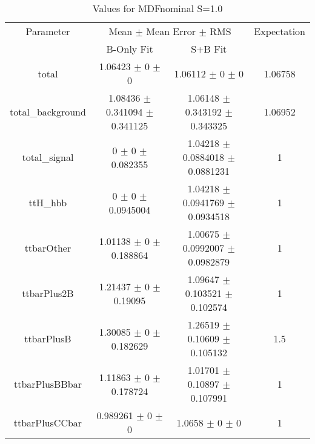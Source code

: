 \begin{table}
\centering
\caption{Values for MDFnominal S=1.0}
\begin{tabular}{cccc}
\toprule
Parameter & \multicolumn{2}{c}{Mean $\pm$ Mean Error $\pm$ RMS} & Expectation\\
 & B-Only Fit & S+B Fit & \\
\midrule
total & \num{1.06423} $\pm$ \num{0} $\pm$ \num{0} & \num{1.06112} $\pm$ \num{0} $\pm$ \num{0} & \num{1.06758}\\
total\_background & \num{1.08436} $\pm$ \num{0.341094} $\pm$ \num{0.341125} & \num{1.06148} $\pm$ \num{0.343192} $\pm$ \num{0.343325} & \num{1.06952}\\
total\_signal & \num{0} $\pm$ \num{0} $\pm$ \num{0.082355} & \num{1.04218} $\pm$ \num{0.0884018} $\pm$ \num{0.0881231} & \num{1}\\
ttH\_hbb & \num{0} $\pm$ \num{0} $\pm$ \num{0.0945004} & \num{1.04218} $\pm$ \num{0.0941769} $\pm$ \num{0.0934518} & \num{1}\\
ttbarOther & \num{1.01138} $\pm$ \num{0} $\pm$ \num{0.188864} & \num{1.00675} $\pm$ \num{0.0992007} $\pm$ \num{0.0982879} & \num{1}\\
ttbarPlus2B & \num{1.21437} $\pm$ \num{0} $\pm$ \num{0.19095} & \num{1.09647} $\pm$ \num{0.103521} $\pm$ \num{0.102574} & \num{1}\\
ttbarPlusB & \num{1.30085} $\pm$ \num{0} $\pm$ \num{0.182629} & \num{1.26519} $\pm$ \num{0.10609} $\pm$ \num{0.105132} & \num{1.5}\\
ttbarPlusBBbar & \num{1.11863} $\pm$ \num{0} $\pm$ \num{0.178724} & \num{1.01701} $\pm$ \num{0.10897} $\pm$ \num{0.107991} & \num{1}\\
ttbarPlusCCbar & \num{0.989261} $\pm$ \num{0} $\pm$ \num{0} & \num{1.0658} $\pm$ \num{0} $\pm$ \num{0} & \num{1}\\
\bottomrule
\end{tabular}
\end{table}